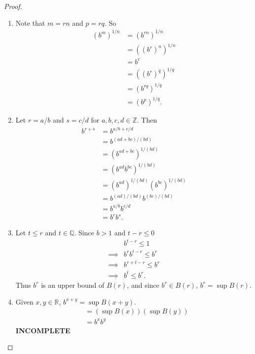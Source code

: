 \documentclass[12pt]{article}
\theoremstyle{definition}
\begin{document}
\begin{proof}\
	\begin{enumerate}[label=(\alph*)]
		\item
		      Note that $m = rn$ and $p = rq$.
		      So \begin{align*}
			      (b^m)^{1/n} & = (b^{rn})^{1/n}  \\
			                  & = ((b^r)^n)^{1/n} \\
			                  & = b^r             \\
			                  & = ((b^r)^q)^{1/q} \\
			                  & = (b^{rq})^{1/q}  \\
			                  & = (b^p)^{1/q}.
		      \end{align*}
		\item
		      Let $r = a/b$ and $s = c/d$ for $a, b, c, d \in \mathbb{Z}$.
		      Then \begin{align*}
			      b^{r + s} & = b^{a/b + c/d}                      \\
			                & = b^{(ad + bc)/(bd)}                 \\
			                & = (b^{ad + bc})^{1/(bd)}             \\
			                & = (b^{ad}b^{bc})^{1/(bd)}            \\
			                & = (b^{ad})^{1/(bd)}(b^{bc})^{1/(bd)} \\
			                & = b^{(ad)/(bd)}b^{(bc)/(bd)}         \\
			                & = b^{a/b}b^{c/d}                     \\
			                & = b^rb^s.
		      \end{align*}
		\item
		      Let $t \leq r$ and $t \in \mathbb{Q}$.
		      Since $b > 1$ and $t - r \leq 0$ \begin{align*}
			               & b^{t - r} \leq 1       \\
			      \implies & b^rb^{t-r} \leq b^r    \\
			      \implies & b^{r + t - r} \leq b^r \\
			      \implies & b^t \leq b^r.
		      \end{align*}
		      Thus $b^r$ is an upper bound of $B(r)$, and since $b^r \in B(r)$, $b^r = \sup B(r)$.
		\item
		      Given $x, y \in \mathbb{R}$, $b^{x + y} = \sup B(x + y)$.
		      \begin{align*}
			       & = \left(\sup B(x)\right) \left(\sup B(y)\right) \\
			       & = b^xb^y
		      \end{align*}
		      \textbf{INCOMPLETE}
	\end{enumerate}
\end{proof}
\end{document}

